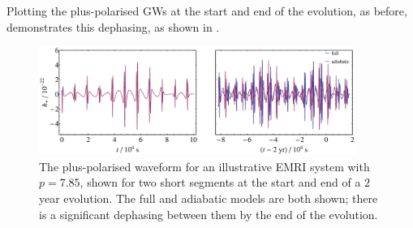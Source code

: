 Plotting the plus-polarised GWs at the start and end of the evolution, as before, demonstrates this dephasing, as shown in .
\begin{figure}
\centering
\includegraphics[width=0.92\textwidth]{Fig_dephased_waveform}
\caption{\label{fig:dephased-waveform}The plus-polarised waveform for an illustrative EMRI system with $p=7.85$, shown for two short segments at the start and end of a $2$ year evolution. The full and adiabatic models are both shown; there is a significant dephasing between them by the end of the evolution.}
\end{figure}

